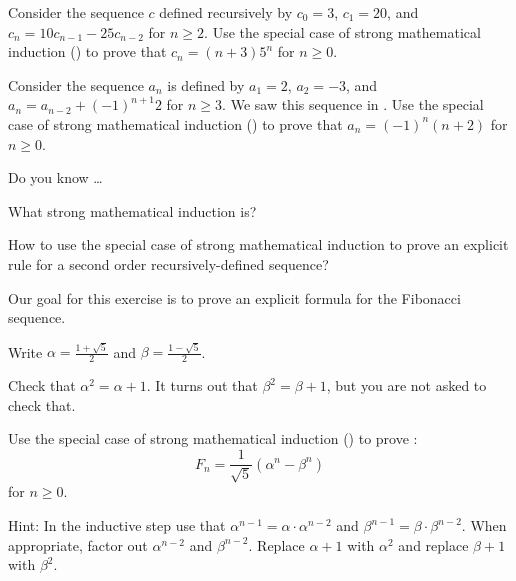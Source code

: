 \begin{exer}[\exerU] %
 \label{exer_math_ind_second_order_powerof5}   
    Consider the sequence $c$ defined recursively by $c_0=3$, $c_1=20$, and $c_n=10c_{n-1} -25c_{n-2}$ for $n \ge 2$.   Use the special case of strong mathematical induction () to prove that $c_n=(n+3)5^n$ for $n \ge 0$.
\end{exer}

\begin{exer}[\exerU] %
\label{exer_strong_math_ind_alternating} 
    Consider the sequence $a_n$ is defined by $a_1=2$, $a_2=-3$, and $a_n=a_{n-2}+(-1)^{n+1}2$ for $n\ge 3$. We saw this sequence in .  Use the special case of strong mathematical induction () to prove that $a_n=(-1)^n(n+2)$ for $n \ge 0$.
\end{exer}

\begin{exer}[\exerR] %
\label{exer_dyk_strong_math_ind}
    Do you know \ldots
        \begin{exerpart}
            \item What strong mathematical induction is?
            \item How to use the special case of strong mathematical induction to prove an explicit rule for a second order recursively-defined sequence?
        \end{exerpart}
\end{exer}

\begin{exer}[\exerE] %
\label{exer_binets_formula}
    Our goal for this exercise is to prove an explicit formula for the Fibonacci sequence.  
    
    Write $\alpha = \displaystyle \frac{1+\sqrt{5}}{2}$ and $\beta = \displaystyle \frac{1-\sqrt{5}}{2}$.   
        \begin{exerpart}
            \item Check that  $\alpha^2 = \alpha + 1$.  It turns out that $\beta^2 = \beta + 1$, but you are not asked to check that.
            \item  Use the special case of strong mathematical induction () to prove :  $$F_n = \frac{1}{\sqrt{5}}\left(\alpha^n-\beta^n\right)$$ for $n \ge 0$.  
            
            Hint: In the inductive step use that $\alpha^{n-1}= \alpha \cdot \alpha^{n-2}$ and $\beta^{n-1}= \beta \cdot \beta^{n-2}$.  When appropriate, factor out $\alpha^{n-2}$ and $\beta^{n-2}$.  Replace $\alpha +1$ with $\alpha^2$ and replace $\beta + 1$ with $\beta^2$.
        \end{exerpart}
\end{exer}

